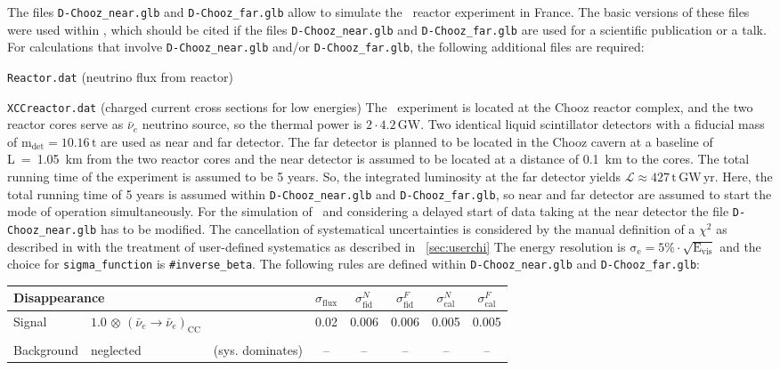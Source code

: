 The files {\tt D-Chooz\_near.glb} and {\tt D-Chooz\_far.glb} allow to simulate the \DC\ reactor experiment in France. 
The basic versions of these files were used within \cite{Huber:2006vr}, which should be cited if the files 
{\tt D-Chooz\_near.glb} and {\tt D-Chooz\_far.glb} are
used for a scientific publication or a talk. For calculations that involve {\tt D-Chooz\_near.glb} and/or {\tt D-Chooz\_far.glb}, the following
additional files are required:
\bi
\item {\tt Reactor.dat} (neutrino flux from reactor)
\item {\tt XCCreactor.dat} (charged current cross sections for low energies)
\ei
The \DC\ experiment is located at the Chooz reactor complex, and the two reactor cores serve as $\bar{\nu}_e$
neutrino source, so the thermal power is $\mathrm{2\cdot4.2\,GW}$. Two identical liquid scintillator detectors
with a fiducial mass of $\mathrm{m_{det} = 10.16 \,t}$ are used as near and far detector. The far detector
is planned to be located in the {\sc Chooz} cavern at a baseline of L~=~1.05~km from the two reactor cores and
the near detector is assumed to be located at a distance of 0.1~km to the cores. The total running time of the
experiment is assumed to be 5 years. So, the integrated luminosity at the far detector yields $\mathrm{\mathcal{L} \approx
427 \,t \, GW\, yr}$.
Here, the total running time of 5 years is assumed within {\tt D-Chooz\_near.glb} and {\tt D-Chooz\_far.glb}, so near
and far detector are assumed to start the mode of operation simultaneously. For the simulation of \DC\ and
considering a delayed start of data taking at the near detector the file {\tt D-Chooz\_near.glb} has to be
modified. The cancellation of systematical uncertainties is considered by the manual definition of a $\chi^2$
as described in \cite{Huber:2006vr} with the treatment of user-defined systematics as described in \Sec~\ref{sec:userchi}   
The energy resolution is
$\mathrm{\sigma_e=5\%\cdot\sqrt{E_{vis}}}$ and the choice for {\tt sigma\_function} is {\tt \#inverse\_beta}. The following rules are defined within {\tt D-Chooz\_near.glb} and {\tt D-Chooz\_far.glb}: 
\begin{center}
\begin{tabular}{|l|ll|c|c|c|c|c|}
\hline \hline
\multicolumn{3}{|l|}{Disappearance} & $\sigma_\mathrm{flux}$ & $\sigma^N_\mathrm{fid}$ & $\sigma^F_\mathrm{fid}$ &
$\sigma^N_\mathrm{cal}$ & $\sigma^F_\mathrm{cal}$ \\ \hline 
Signal & $1.0 \, \otimes \, (\bar{\nu}_e\rightarrow\bar{\nu}_e)_{\mathrm{CC}}$ & & 0.02 & 0.006 & 0.006 & 0.005 &
0.005 \\
 & & & & & & & \\
Background & neglected & (sys. dominates) & -- & -- & -- & -- & -- \\ \hline \hline 
\end{tabular}
\end{center}

